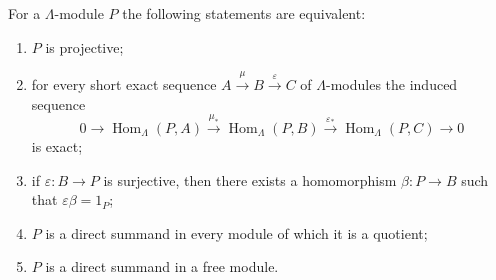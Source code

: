 For a $\Lambda$-module $P$ the following statements are equivalent:
\begin{enumerate}
\item[(1)] $P$ is projective;
\item[(2)] for every short exact sequence $A \xrightarrow{\mu} B \xrightarrow{\varepsilon} C$ of $\Lambda$-modules the induced sequence
$$0 \rightarrow \operatorname{Hom}_\Lambda(P, A) \xrightarrow{\mu_*} \operatorname{Hom}_\Lambda(P, B) \xrightarrow{\varepsilon_*} \operatorname{Hom}_\Lambda(P, C) \rightarrow 0$$
is exact;
\item[(3)] if $\varepsilon : B \rightarrow P$ is surjective, then there exists a homomorphism $\beta : P \rightarrow B$ such that $\varepsilon \beta = 1_P$;
\item[(4)] $P$ is a direct summand in every module of which it is a quotient;
\item[(5)] $P$ is a direct summand in a free module.
\end{enumerate}

